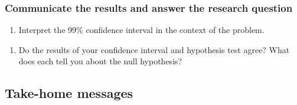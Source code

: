 \documentclass[
]{report}
\newenvironment{Shaded}{\begin{snugshade}}{\end{snugshade}}
\newcommand{\AttributeTok}[1]{\textcolor[rgb]{0.77,0.63,0.00}{#1}}
\newcommand{\CommentTok}[1]{\textcolor[rgb]{0.56,0.35,0.01}{\textit{#1}}}
\newcommand{\DecValTok}[1]{\textcolor[rgb]{0.00,0.00,0.81}{#1}}
\newcommand{\FunctionTok}[1]{\textcolor[rgb]{0.00,0.00,0.00}{#1}}
\newcommand{\NormalTok}[1]{#1}
\newcommand{\SpecialCharTok}[1]{\textcolor[rgb]{0.00,0.00,0.00}{#1}}
\providecommand{\tightlist}{%
  \setlength{\itemsep}{0pt}\setlength{\parskip}{0pt}}
\begin{document}
\begin{Shaded}
\end{Shaded}

\vspace{.5in}

\hypertarget{communicate-the-results-and-answer-the-research-question-2}{%
\subsubsection*{Communicate the results and answer the research question}\label{communicate-the-results-and-answer-the-research-question-2}}

\begin{enumerate}
\def\labelenumi{\arabic{enumi}.}
\setcounter{enumi}{17}
\tightlist
\item
  Interpret the 99\% confidence interval in the context of the problem.
\end{enumerate}

\vspace{0.7in}

\begin{enumerate}
\def\labelenumi{\arabic{enumi}.}
\setcounter{enumi}{18}
\tightlist
\item
  Do the results of your confidence interval and hypothesis test agree? What does each tell you about the null hypothesis?
\end{enumerate}

\vspace{.7in}

\hypertarget{take-home-messages-4}{%
\subsection{Take-home messages}\label{take-home-messages-4}}
\end{document}
